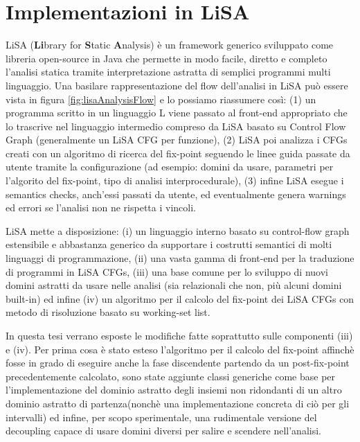 \chapter{Implementazioni in LiSA}\label{chapter:lisa}



LiSA (\textbf{Li}brary for \textbf{S}tatic \textbf{A}nalysis) è un framework generico sviluppato come libreria open-source in Java che permette in modo facile, diretto e completo l'analisi statica tramite interpretazione astratta di semplici programmi multi linguaggio. Una basilare rappresentazione del flow dell'analisi in LiSA può essere vista in figura \ref{fig:lisaAnalysisFlow} e lo possiamo riassumere così: (1) un programma scritto in un linguaggio L viene passato al front-end appropriato che lo trascrive nel linguaggio intermedio compreso da LiSA basato su Control Flow Graph (generalmente un LiSA CFG per funzione), (2) LiSA poi analizza i CFGs creati con un algoritmo di ricerca del fix-point seguendo le linee guida passate da utente tramite la configurazione (ad esempio: domini da usare, parametri per l'algorito del fix-point, tipo di analisi interprocedurale), (3) infine LiSA esegue i semantics checks, anch'essi passati da utente, ed eventualmente genera warnings ed errori se l'analisi non ne rispetta i vincoli. 

LiSA mette a disposizione: (i) un linguaggio interno basato su control-flow graph estensibile e abbastanza generico da supportare i costrutti semantici di molti linguaggi di programmazione, (ii) una vasta gamma di front-end per la traduzione di programmi in LiSA CFGs, (iii) una base comune per lo sviluppo di nuovi domini astratti da usare nelle analisi (sia relazionali che non, più alcuni domini built-in) ed infine (iv) un algoritmo per il calcolo del fix-point dei LiSA CFGs con metodo di risoluzione basato su working-set list.

In questa tesi verrano esposte le modifiche fatte soprattutto sulle componenti (iii) e (iv). Per prima cosa è stato esteso l'algoritmo per il calcolo del fix-point affinchè fosse in grado di eseguire anche la fase discendente partendo da un post-fix-point precedentemente calcolato, sono state aggiunte classi generiche come base per l'implementazione del dominio astratto degli insiemi non ridondanti di un altro dominio astratto di partenza(nonchè una implementazione concreta di ciò per gli intervalli) ed infine, per scopo sperimentale, una rudimentale versione del decoupling capace di usare domini diversi per salire e scendere nell'analisi.

